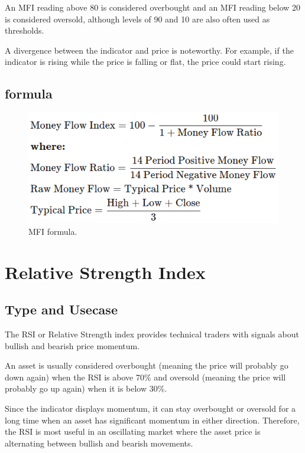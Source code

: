 \documentclass[12pt,a4paper]{article}
\begin{document}
An MFI reading above 80 is considered overbought and an MFI reading below 20 is considered oversold, although levels of 90 and 10 are also often used as thresholds.

A divergence between the indicator and price is noteworthy. For example, if the indicator is rising while the price is falling or flat, the price could start rising.

\subsection{formula}

\begin{figure}[H]
    \includegraphics[scale=0.7]{../images/MFI.png}
    \caption{MFI formula.}
    \label{fig:MFI}
\end{figure}

\section{Relative Strength Index}

\subsection{Type and Usecase}
The RSI or Relative Strength index provides technical traders with signals about bullish and bearish price momentum.

An asset is usually considered overbought (meaning the price will probably go down again) when the RSI is above 70\% and oversold (meaning the price will probably go up again) when it is below 30\%.

Since the indicator displays momentum, it can stay overbought or oversold for a long time when an asset has significant momentum in either direction. Therefore, the RSI is most useful in an oscillating market where the asset price is alternating between bullish and bearish movements.
\end{document}
